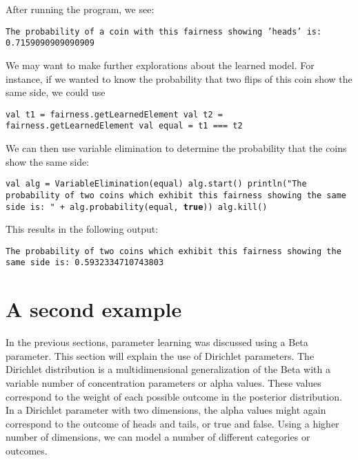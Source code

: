 After running the program, we see:

\begin{flushleft}
\texttt{The probability of a coin with this fairness showing 'heads' is:
0.7159090909090909}
\end{flushleft}

We may want to make further explorations about the learned model. For instance, if we wanted to know the probability that two flips of this coin show the same side, we could use

\begin{flushleft}
\texttt{val t1 = fairness.getLearnedElement 
\newline val t2 = fairness.getLearnedElement 
\newline val equal = t1 === t2}
\end{flushleft}

We can then use variable elimination to determine the probability that the coins show the same side:

\begin{flushleft}
\texttt{val alg = VariableElimination(equal)
\newline alg.start()
\newline println("The probability of two coins which exhibit this fairness showing the same side is: " + alg.probability(equal, \textbf{true}))
\newline alg.kill()
}
\end{flushleft}

This results in the following output:

\begin{flushleft}
\texttt{The probability of two coins which exhibit this fairness showing the same side is: 0.5932334710743803}
\end{flushleft}

\section{A second example}

In the previous sections, parameter learning was discussed using a Beta parameter. This section will explain the use of Dirichlet parameters. The Dirichlet distribution is a multidimensional generalization of the Beta with a variable number of concentration parameters or alpha values. These values correspond to the weight of each possible outcome in the posterior distribution. In a Dirichlet parameter with two dimensions, the alpha values might again correspond to the outcome of heads and tails, or true and false. Using a higher number of dimensions, we can model a number of different categories or outcomes.

